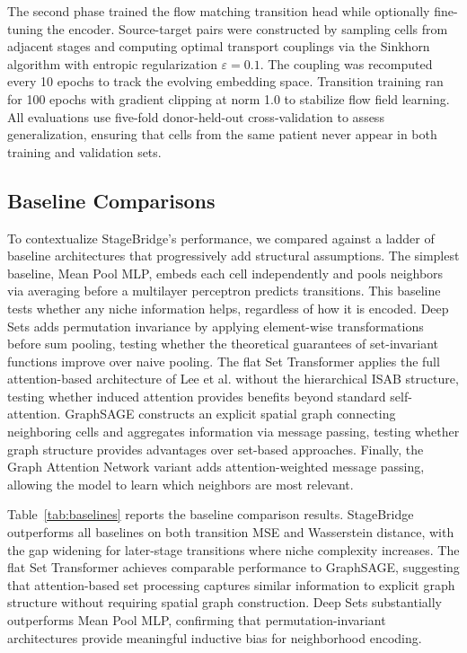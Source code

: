 \documentclass[conference]{IEEEtran}
\begin{document}
The second phase trained the flow matching transition head while optionally fine-tuning the encoder. Source-target pairs were constructed by sampling cells from adjacent stages and computing optimal transport couplings via the Sinkhorn algorithm with entropic regularization $\varepsilon = 0.1$. The coupling was recomputed every 10 epochs to track the evolving embedding space. Transition training ran for 100 epochs with gradient clipping at norm 1.0 to stabilize flow field learning. All evaluations use five-fold donor-held-out cross-validation to assess generalization, ensuring that cells from the same patient never appear in both training and validation sets.

\subsection{Baseline Comparisons}

To contextualize StageBridge's performance, we compared against a ladder of baseline architectures that progressively add structural assumptions. The simplest baseline, Mean Pool MLP, embeds each cell independently and pools neighbors via averaging before a multilayer perceptron predicts transitions. This baseline tests whether any niche information helps, regardless of how it is encoded. Deep Sets \cite{Zaheer2017-gu} adds permutation invariance by applying element-wise transformations before sum pooling, testing whether the theoretical guarantees of set-invariant functions improve over naive pooling. The flat Set Transformer applies the full attention-based architecture of Lee et al. \cite{Lee2018-ya} without the hierarchical ISAB structure, testing whether induced attention provides benefits beyond standard self-attention. GraphSAGE \cite{Hamilton2017-ne} constructs an explicit spatial graph connecting neighboring cells and aggregates information via message passing, testing whether graph structure provides advantages over set-based approaches. Finally, the Graph Attention Network variant adds attention-weighted message passing, allowing the model to learn which neighbors are most relevant.

Table~\ref{tab:baselines} reports the baseline comparison results. StageBridge outperforms all baselines on both transition MSE and Wasserstein distance, with the gap widening for later-stage transitions where niche complexity increases. The flat Set Transformer achieves comparable performance to GraphSAGE, suggesting that attention-based set processing captures similar information to explicit graph structure without requiring spatial graph construction. Deep Sets substantially outperforms Mean Pool MLP, confirming that permutation-invariant architectures provide meaningful inductive bias for neighborhood encoding.
\end{document}

